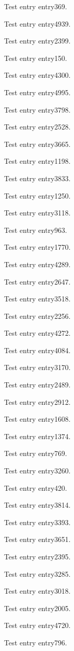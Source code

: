 Test entry \gls{entry369}.

Test entry \gls{entry4939}.

Test entry \gls{entry2399}.

Test entry \gls{entry150}.

Test entry \gls{entry4300}.

Test entry \gls{entry4995}.

Test entry \gls{entry3798}.

Test entry \gls{entry2528}.

Test entry \gls{entry3665}.

Test entry \gls{entry1198}.

Test entry \gls{entry3833}.

Test entry \gls{entry1250}.

Test entry \gls{entry3118}.

Test entry \gls{entry963}.

Test entry \gls{entry1770}.

Test entry \gls{entry4289}.

Test entry \gls{entry2647}.

Test entry \gls{entry3518}.

Test entry \gls{entry2256}.

Test entry \gls{entry4272}.

Test entry \gls{entry4084}.

Test entry \gls{entry3170}.

Test entry \gls{entry2489}.

Test entry \gls{entry2912}.

Test entry \gls{entry1608}.

Test entry \gls{entry1374}.

Test entry \gls{entry769}.

Test entry \gls{entry3260}.

Test entry \gls{entry420}.

Test entry \gls{entry3814}.

Test entry \gls{entry3393}.

Test entry \gls{entry3651}.

Test entry \gls{entry2395}.

Test entry \gls{entry3285}.

Test entry \gls{entry3018}.

Test entry \gls{entry2005}.

Test entry \gls{entry4720}.

Test entry \gls{entry796}.


